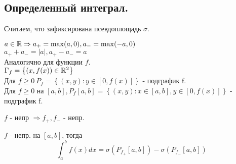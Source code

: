  

\subsection{Определенный интеграл.}

Считаем, что зафиксирована псевдоплощадь $\sigma$.


\begin{definition}
    $a \in \mathbb{R} \Rightarrow a_+ = \max(a, 0), a_- = \max(-a, 0)$ \\
    $a_+ + a_- = |a|, a_+ - a_- = a$ \\
    Аналогично для функции $f$. \\

    $\Gamma_f = \left\{(x, f(x)) \in \mathbb{R}^2\right\}$ \\
    Для $f \geq 0 \  P_f = \left\{ (x, y) : y \in [0, f(x)]\right\}$ - подграфик f. \\
    Для $f \geq 0$ на $[a, b], P_f[a, b] = \left\{ (x, y) : x \in [a, b], y \in [0, f(x)]\right\}$ - подграфик f.
\end{definition}

\begin{remark}
    $f$ - непр $\Rightarrow f_+, f_-$ - непр.
\end{remark}

\begin{definition}
    $f$ - непр. на $[a, b]$, тогда \\
    \[\int_a^b f(x) dx = \sigma(P_{f_+} [a, b]) - \sigma(P_{f_-}[a, b])\]
\end{definition}

